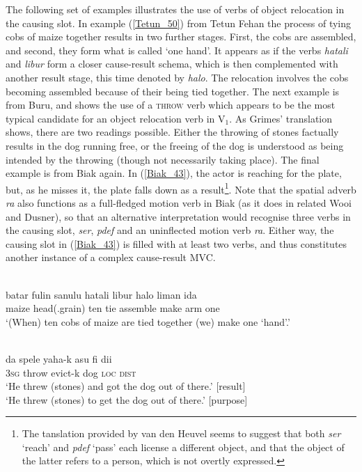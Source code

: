 The following set of examples illustrates the use of verbs of object relocation in the causing slot. In example (\ref{Tetun_50}) from Tetun Fehan the process of tying cobs of maize together results in two further stages. First, the cobs are assembled, and second, they form what is called `one hand'. It appears as if the verbs \textit{hatali} and \textit{libur} form a closer cause-result schema, which is then complemented with another result stage, this time denoted by \textit{halo}. The relocation involves the cobs becoming assembled because of their being tied together. The next example is from Buru, and shows the use of a \textsc{throw} verb which appears to be the most typical candidate for an object relocation verb in V$_1$. As Grimes' translation shows, there are two readings possible. Either the throwing of stones factually results in the dog running free, or the freeing of the dog is understood as being intended by the throwing (though not necessarily taking place). The final example is from Biak again. In (\ref{Biak_43}), the actor is reaching for the plate, but, as he misses it, the plate falls down as a result\footnote{The tanslation provided by van den Heuvel seems to suggest that both \textit{ser} `reach' and \textit{pdef} `pass' each license a different object, and that the object of the latter refers to a person, which is not overtly expressed.}. Note that the spatial adverb \textit{ra} also functions as a full-fledged motion verb in Biak (as it does in related Wooi and Dusner), so that an alternative interpretation would recognise three verbs in the causing slot, \textit{ser}, \textit{pdef} and an uninflected motion verb \textit{ra}. Either way, the causing slot in (\ref{Biak_43}) is filled with at least two verbs, and thus constitutes another instance of a complex cause-result MVC.

\ea \label{Tetun_50}
\\
\gll batar fulin sanulu hatali libur halo liman ida \\
maize head(.grain) ten tie assemble make arm one \\
\glft `(When) ten cobs of maize are tied together (we) make one `hand'.'\\ 
\z

\ea \label{Buru_21}
\\
\gll da spele yaha-k asu fi dii \\
3\textsc{sg} throw evict-k dog \textsc{loc} \textsc{dist} \\
\glft `He threw (stones) and got the dog out of there.' [result] \\
`He threw (stones) to get the dog out of there.' [purpose]\\ 
\z

